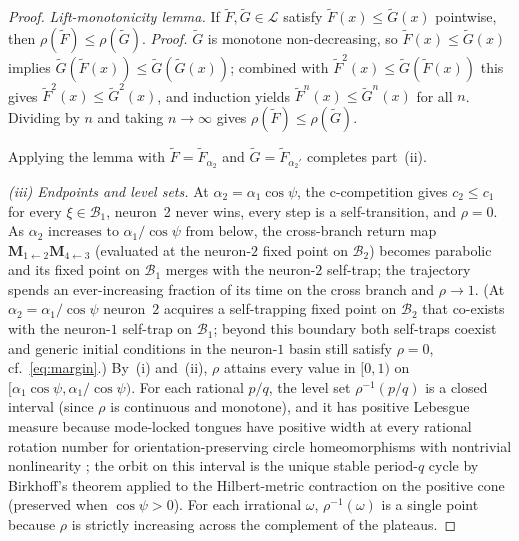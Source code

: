 \documentclass[12pt]{article}
\newcommand{\vv}[1]{\mathbf{#1}}
\newcommand{\Bsp}{\mathcal{B}}
\begin{document}
\begin{proof}
\emph{Lift-monotonicity lemma.} If $\widetilde F,\widetilde G\in\mathcal{L}$ satisfy $\widetilde F(x)\leq\widetilde G(x)$ pointwise, then $\rho(\widetilde F)\leq\rho(\widetilde G)$.
\emph{Proof.} $\widetilde G$ is monotone non-decreasing, so $\widetilde F(x)\leq\widetilde G(x)$ implies $\widetilde G(\widetilde F(x))\leq\widetilde G(\widetilde G(x))$; combined with $\widetilde F^2(x)\leq\widetilde G(\widetilde F(x))$ this gives $\widetilde F^2(x)\leq\widetilde G^2(x)$, and induction yields $\widetilde F^n(x)\leq\widetilde G^n(x)$ for all $n$. Dividing by $n$ and taking $n\to\infty$ gives $\rho(\widetilde F)\leq\rho(\widetilde G)$.

Applying the lemma with $\widetilde F=\widetilde F_{\alpha_2}$ and $\widetilde G=\widetilde F_{\alpha_2'}$ completes part~(ii).

\emph{(iii) Endpoints and level sets.} At $\alpha_2=\alpha_1\cos\psi$, the c-competition gives $c_2\leq c_1$ for every $\xi\in\Bsp_1$, neuron~2 never wins, every step is a self-transition, and $\rho=0$. As $\alpha_2 \text{ increases to } \alpha_1/\cos\psi \text{ from below}$, the cross-branch return map $\vv{M}_{1\leftarrow 2}\vv{M}_{4\leftarrow 3}$ (evaluated at the neuron-$2$ fixed point on $\Bsp_2$) becomes parabolic and its fixed point on $\Bsp_1$ merges with the neuron-$2$ self-trap; the trajectory spends an ever-increasing fraction of its time on the cross branch and $\rho\to 1$. (At $\alpha_2=\alpha_1/\cos\psi$ neuron~$2$ acquires a self-trapping fixed point on $\Bsp_2$ that co-exists with the neuron-$1$ self-trap on $\Bsp_1$; beyond this boundary both self-traps coexist and generic initial conditions in the neuron-$1$ basin still satisfy $\rho=0$, cf.~\eqref{eq:margin}.) By~(i) and~(ii), $\rho$ attains every value in $[0,1)$ on $[\alpha_1\cos\psi,\alpha_1/\cos\psi)$. For each rational $p/q$, the level set $\rho^{-1}(p/q)$ is a closed interval (since $\rho$ is continuous and monotone), and it has positive Lebesgue measure because mode-locked tongues have positive width at every rational rotation number for orientation-preserving circle homeomorphisms with nontrivial nonlinearity \citep{arnold1961small,demelo2012one}; the orbit on this interval is the unique stable period-$q$ cycle by Birkhoff's theorem applied to the Hilbert-metric contraction on the positive cone (preserved when $\cos\psi>0$). For each irrational $\omega$, $\rho^{-1}(\omega)$ is a single point because $\rho$ is strictly increasing across the complement of the plateaus.
\end{proof}
\end{document}
